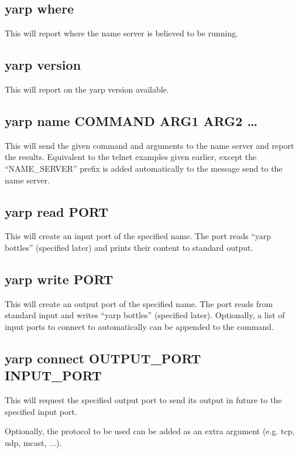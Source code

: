 \documentclass[a4]{article}
\begin{document}
\subsection{yarp where}

This will report where the name server is believed to be running.

\subsection{yarp version}

This will report on the yarp version available.

\subsection{yarp name COMMAND ARG1 ARG2 \ldots}

This will send the given command and arguments to the name
server and report the results.  Equivalent to the telnet
examples given earlier, except the ``NAME\_SERVER'' prefix
is added automatically to the message send to the name server.

\subsection{yarp read PORT}

This will create an input port of the specified name.  The port
reads ``yarp bottles'' (specified later) and prints their content
to standard output.

\subsection{yarp write PORT}

This will create an output port of the specified name.  The port
reads from standard input and writes ``yarp bottles'' (specified later).
Optionally, a list of input ports to connect to automatically can be
appended to the command.

\subsection{yarp connect OUTPUT\_PORT INPUT\_PORT}

This will request the specified output port to send its output in 
future to the specified input port.

Optionally, the protocol to be used can be added as an extra argument
(e.g. tcp, udp, mcast, ...).
\end{document}
